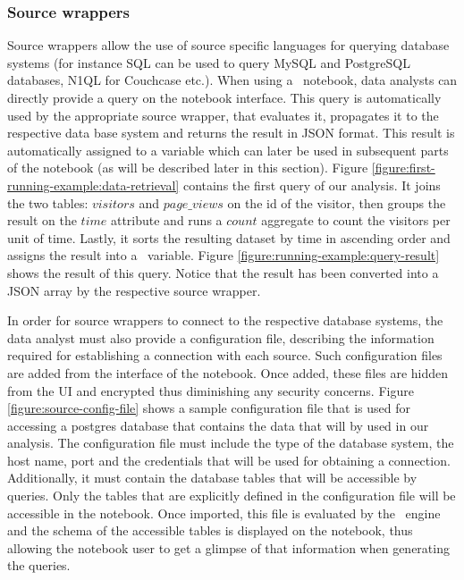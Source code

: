 \subsubsection*{Source wrappers}

Source wrappers allow the use of source specific languages for querying database systems (for instance SQL can be used to query MySQL and PostgreSQL databases, N1QL for Couchcase etc.). When using a \projname\ notebook, data analysts can directly provide a query on the notebook interface. This query is automatically used by the appropriate source wrapper, that evaluates it, propagates it to the respective data base system and returns the result in JSON format. This result is automatically assigned to a variable which can later be used in subsequent parts of the notebook (as will be described later in this section). Figure \ref{figure:first-running-example:data-retrieval} contains the first query of our analysis. It joins the two tables: $visitors$ and $page\_views$ on the id of the visitor, then groups the result on the $time$ attribute and runs a $count$ aggregate to count the visitors per unit of time. Lastly, it sorts the resulting dataset by time in ascending order and assigns the result into a \projname\ variable. Figure \ref{figure:running-example:query-result} shows the result of this query. Notice that the result has been converted into a JSON array by the respective source wrapper. 

In order for source wrappers to connect to the respective database systems, the data analyst must also provide a configuration file, describing the information required for establishing a connection with each source. Such configuration files are added from the interface of the notebook. Once added, these files are hidden from the UI and encrypted thus diminishing any security concerns. Figure \ref{figure:source-config-file} shows a sample configuration file that is used for accessing a postgres database that contains the data that will by used in our analysis. The configuration file must include the type of the database system, the host name, port and the credentials that will be used for obtaining a connection. Additionally, it must contain the database tables that will be accessible by queries. Only the tables that are explicitly defined in the configuration file will be accessible in the notebook. Once imported, this file is evaluated by the \projname\ engine and the schema of the accessible tables is displayed on the notebook, thus allowing the notebook user to get a glimpse of that information when generating the queries. 



